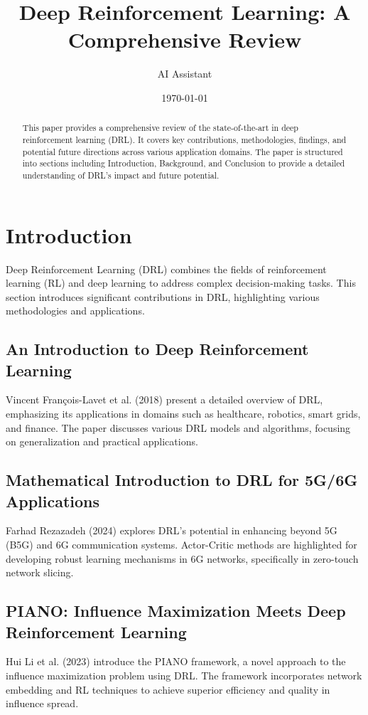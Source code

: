 \documentclass{article}
\title{Deep Reinforcement Learning: A Comprehensive Review}
\author{AI Assistant}
\date{\today}
\begin{document}
\maketitle

\begin{abstract}
This paper provides a comprehensive review of the state-of-the-art in deep reinforcement learning (DRL). It covers key contributions, methodologies, findings, and potential future directions across various application domains. The paper is structured into sections including Introduction, Background, and Conclusion to provide a detailed understanding of DRL's impact and future potential.
\end{abstract}

\section{Introduction}
Deep Reinforcement Learning (DRL) combines the fields of reinforcement learning (RL) and deep learning to address complex decision-making tasks. This section introduces significant contributions in DRL, highlighting various methodologies and applications.

\subsection{An Introduction to Deep Reinforcement Learning}
Vincent François-Lavet et al. (2018) present a detailed overview of DRL, emphasizing its applications in domains such as healthcare, robotics, smart grids, and finance. The paper discusses various DRL models and algorithms, focusing on generalization and practical applications.

\subsection{Mathematical Introduction to DRL for 5G/6G Applications}
Farhad Rezazadeh (2024) explores DRL's potential in enhancing beyond 5G (B5G) and 6G communication systems. Actor-Critic methods are highlighted for developing robust learning mechanisms in 6G networks, specifically in zero-touch network slicing.

\subsection{PIANO: Influence Maximization Meets Deep Reinforcement Learning}
Hui Li et al. (2023) introduce the PIANO framework, a novel approach to the influence maximization problem using DRL. The framework incorporates network embedding and RL techniques to achieve superior efficiency and quality in influence spread.
\end{document}
